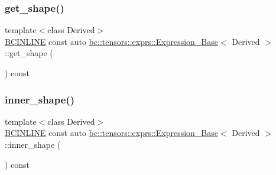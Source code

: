 \subsubsection{\texorpdfstring{get\+\_\+shape()}{get\_shape()}}
{\footnotesize\ttfamily template$<$class Derived$>$ \\
\hyperlink{common_8h_a6699e8b0449da5c0fafb878e59c1d4b1}{B\+C\+I\+N\+L\+I\+NE} const auto \hyperlink{structbc_1_1tensors_1_1exprs_1_1Expression__Base}{bc\+::tensors\+::exprs\+::\+Expression\+\_\+\+Base}$<$ Derived $>$\+::get\+\_\+shape (\begin{DoxyParamCaption}{ }\end{DoxyParamCaption}) const\hspace{0.3cm}{\ttfamily [inline]}}

\mbox{\label{structbc_1_1tensors_1_1exprs_1_1Expression__Base_a8680e24e460343891b21b8f2f39e3631}} 
\subsubsection{\texorpdfstring{inner\+\_\+shape()}{inner\_shape()}}
{\footnotesize\ttfamily template$<$class Derived$>$ \\
\hyperlink{common_8h_a6699e8b0449da5c0fafb878e59c1d4b1}{B\+C\+I\+N\+L\+I\+NE} const auto \hyperlink{structbc_1_1tensors_1_1exprs_1_1Expression__Base}{bc\+::tensors\+::exprs\+::\+Expression\+\_\+\+Base}$<$ Derived $>$\+::inner\+\_\+shape (\begin{DoxyParamCaption}{ }\end{DoxyParamCaption}) const\hspace{0.3cm}{\ttfamily [inline]}}

\mbox{\label{structbc_1_1tensors_1_1exprs_1_1Expression__Base_a2b2142965f6912051f87956e00e0fd1a}} 
